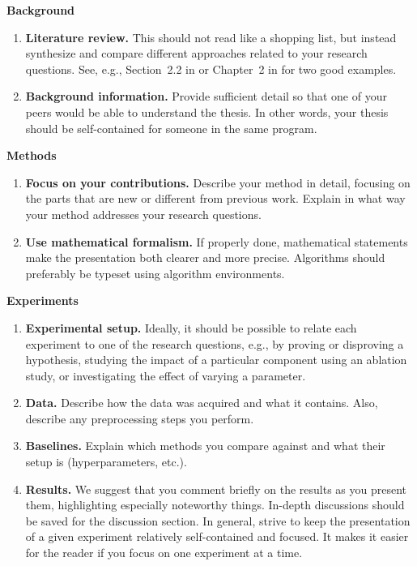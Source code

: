 \documentclass[twoside,11pt]{article}
\begin{document}
\noindent\textbf{Background}

    \begin{enumerate}
        \item \textbf{Literature review.} This should not read like a shopping list, but instead synthesize and compare different approaches related to your research questions. See, e.g., Section~2.2 in \citet{hausner2022explainable} or Chapter~2 in \citet{pettersson2023knowledge} for two good examples.
        \item \textbf{Background information.} Provide sufficient detail so that one of your peers would be able to understand the thesis. In other words, your thesis should be self-contained for someone in the same program.
    \end{enumerate}

\noindent\textbf{Methods}

    \begin{enumerate}
        \item \textbf{Focus on your contributions.} Describe your method in detail, focusing on the parts that are new or different from previous work. Explain in what way your method addresses your research questions.
        \item \textbf{Use mathematical formalism.} If properly done, mathematical statements make the presentation both clearer and more precise. Algorithms should preferably be typeset using algorithm environments. 
    \end{enumerate}

\noindent\textbf{Experiments}
    \begin{enumerate}
        \item \textbf{Experimental setup.} Ideally, it should be possible to relate each experiment to one of the research questions, e.g., by proving or disproving a hypothesis, studying the impact of a particular component using an ablation study, or investigating the effect of varying a parameter.  
        \item \textbf{Data.} Describe how the data was acquired and what it contains. Also, describe any preprocessing steps you perform.
        \item \textbf{Baselines.} Explain which methods you compare against and what their setup is (hyperparameters, etc.).
        \item \textbf{Results.} We suggest that you comment briefly on the results as you present them, highlighting especially noteworthy things. In-depth discussions should be saved for the discussion section. In general, strive to keep the presentation of a given experiment relatively self-contained and focused. It makes it easier for the reader if you focus on one experiment at a time.
    \end{enumerate}
    
\end{document}
